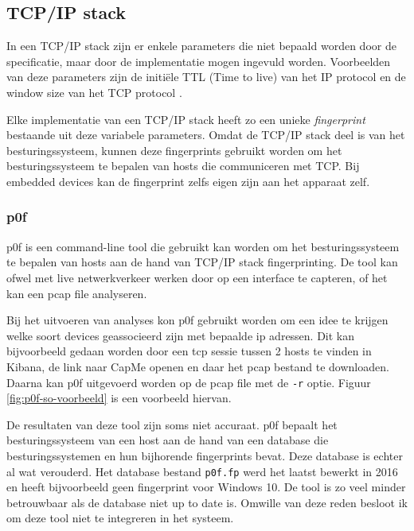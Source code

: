 \documentclass[a4paper,12pt]{report}
\begin{document}
\subsection{TCP/IP stack}
In een TCP/IP stack zijn er enkele parameters die niet bepaald worden door de specificatie, maar door de implementatie mogen ingevuld worden.
Voorbeelden van deze parameters zijn de initiële TTL (Time to live) van het IP protocol en de window size van het TCP protocol \autocite{wikipedia:fingerprinting}.

Elke implementatie van een TCP/IP stack heeft zo een unieke \emph{fingerprint} bestaande uit deze variabele parameters.
Omdat de TCP/IP stack deel is van het besturingssysteem, kunnen deze fingerprints gebruikt worden om het besturingssysteem te bepalen van hosts die communiceren met TCP.
Bij embedded devices kan de fingerprint zelfs eigen zijn aan het apparaat zelf.

\subsubsection{p0f}
p0f is een command-line tool die gebruikt kan worden om het besturingssysteem te bepalen van hosts aan de hand van TCP/IP stack fingerprinting.
De tool kan ofwel met live netwerkverkeer werken door op een interface te capteren, of het kan een pcap file analyseren.

Bij het uitvoeren van analyses kon p0f gebruikt worden om een idee te krijgen welke soort devices geassocieerd zijn met bepaalde ip adressen.
Dit kan bijvoorbeeld gedaan worden door een tcp sessie tussen 2 hosts te vinden in Kibana, de link naar CapMe openen en daar het pcap bestand te downloaden.
Daarna kan p0f uitgevoerd worden op de pcap file met de \lstinline|-r| optie.
Figuur \ref{fig:p0f-so-voorbeeld} is een voorbeeld hiervan.

De resultaten van deze tool zijn soms niet accuraat.
p0f bepaalt het besturingssysteem van een host aan de hand van een database die besturingssystemen en hun bijhorende fingerprints bevat.
Deze database is echter al wat verouderd.
Het database bestand \lstinline|p0f.fp| werd het laatst bewerkt in 2016 en heeft bijvoorbeeld geen fingerprint voor Windows 10.
De tool is zo veel minder betrouwbaar als de database niet up to date is.
Omwille van deze reden besloot ik om deze tool niet te integreren in het systeem.
\end{document}
